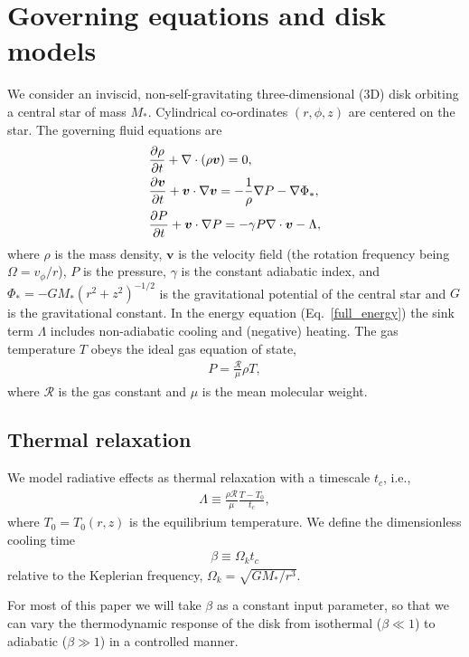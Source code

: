 \section{Governing equations and disk models}\label{setup}
We consider  an inviscid, non-self-gravitating three-dimensional (3D)
disk orbiting a central star of mass $M_*$.  Cylindrical
co-ordinates $(r,\phi, z)$ are centered on the star. The governing fluid equations are
\begin{align}
  &\frac{\p\rho}{\p t} + \nabla\cdot{\left(\rho\bm{v}\right)} = 0,\\
  &\frac{\p\bm{v}}{\p t} + \bm{v}\cdot\nabla\bm{v} =
  -\frac{1}{\rho}\nabla P - \nabla\Phi_*,\\
  &\frac{\p P}{\p t} + \bm{v}\cdot\nabla P  = - \gamma P
  \nabla\cdot\bm{v} - \Lambda %
  , \label{full_energy}
\end{align}
where $\rho$ is the mass density, $\bm{v}$ is the velocity field (the
rotation frequency being $\Omega=v_\phi/r$), $P$
is the pressure, $\gamma$ is the constant adiabatic index, and $\Phi_*
= -GM_*(r^2 + z^2)^{-1/2}$ is the gravitational potential of the
central star and $G$ is the gravitational constant. 
In the energy equation (Eq.\ \ref{full_energy}) the sink term
$\Lambda$ includes non-adiabatic cooling and (negative) heating. 
The gas temperature $T$ obeys the ideal gas 
equation of state,  
\begin{align}
P = \frac{\mathcal{R}}{\mu}\rho T,
\end{align}
where $\mathcal{R}$ is the gas constant and $\mu$ is the mean molecular
weight.    

\subsection{Thermal relaxation}
We model radiative effects as thermal
relaxation with a timescale $t_c$, i.e.,
\begin{align}\label{thermal_relax}
  \Lambda  \equiv \frac{\rho\mathcal{R}}{\mu}\frac{T - T_0}{t_c},
\end{align}
where $T_0=T_0(r,z)$ is the equilibrium temperature.  We 
define the dimensionless cooling time 
\begin{align}\label{beta_def}
  \beta \equiv \Omega_k t_c
\end{align}
relative to the Keplerian frequency, $\Omega_k=\sqrt{GM_*/r^3}$.   

For most of this paper we will take $\beta$ as a constant input
parameter, so that we can vary the thermodynamic response of the
disk from isothermal ($\beta\ll 1$) to adiabatic ($\beta \gg 1$) in a
controlled manner. 

